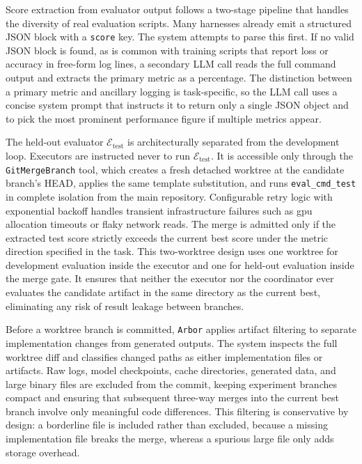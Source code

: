 \documentclass{llmxive}
\providecommand{\arbor}{\texttt{Arbor}}
\providecommand{\Eval}{\mathcal{E}}
\providecommand{\test}{\mathrm{test}}
\begin{document}
Score extraction from evaluator output follows a two-stage pipeline
that handles the diversity of real evaluation scripts. Many harnesses
already emit a structured JSON block with a \texttt{score} key. The system
attempts to parse this first. If no valid JSON block is found, as is
common with training scripts that report loss or accuracy in free-form
log lines, a secondary LLM call reads the full command output and
extracts the primary metric as a percentage. The distinction between a
primary metric and ancillary logging is task-specific, so the LLM call
uses a concise system prompt that instructs it to return only a single
JSON object and to pick the most prominent performance figure if multiple
metrics appear.

The held-out evaluator $\Eval_\test$ is architecturally separated from
the development loop. Executors are instructed never to run $\Eval_\test$.
It is accessible only through the \texttt{GitMergeBranch} tool, which
creates a fresh detached worktree at the candidate branch's HEAD, applies
the same template substitution, and runs \texttt{eval\_cmd\_test} in
complete isolation from the main repository. Configurable retry logic
with exponential backoff handles transient infrastructure failures such as
gpu allocation timeouts or flaky network reads. The merge is admitted only
if the extracted test score strictly exceeds the current best score under
the metric direction specified in the task. This two-worktree design uses one
worktree for development evaluation inside the executor and one for held-out
evaluation inside the merge gate. It ensures that neither the executor nor
the coordinator
ever evaluates the candidate artifact in the same directory as the current best,
eliminating any risk of result leakage between branches.

Before a worktree branch is committed, \arbor{} applies artifact filtering
to separate implementation changes from generated outputs. The system
inspects the full worktree diff and classifies changed paths as either
implementation files or artifacts. Raw logs, model checkpoints,
cache directories, generated data, and large binary files are excluded
from the commit, keeping experiment branches compact and ensuring that
subsequent three-way merges into the current best branch involve only meaningful code
differences. This filtering is conservative by design: a borderline file
is included rather than excluded, because a missing implementation file
breaks the merge, whereas a spurious large file only adds storage overhead.
\end{document}
